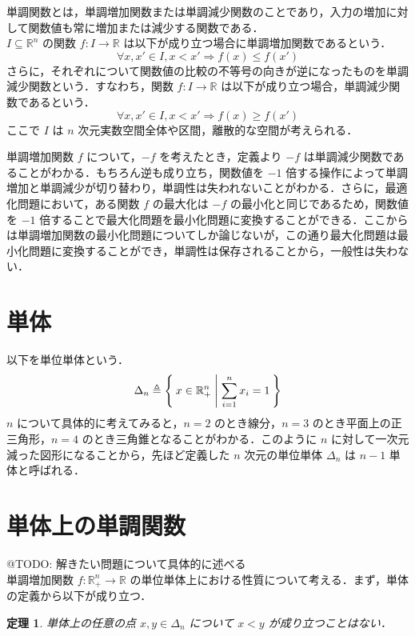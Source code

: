\documentclass[a4paper,11pt]{jreport}
\newtheorem{theorem}{定理}
\begin{document}
単調関数とは，単調増加関数または単調減少関数のことであり，入力の増加に対して関数値も常に増加または減少する関数である．\\
$ I \subseteq \mathbb{R}^n $ の関数 $ f : I \to \mathbb{R} $ は以下が成り立つ場合に単調増加関数であるという．
$$ \forall x, x' \in I, x < x' \Rightarrow f(x) \leq f(x') $$
さらに，それぞれについて関数値の比較の不等号の向きが逆になったものを単調減少関数という．すなわち，関数 $ f : I \to \mathbb{R} $ は以下が成り立つ場合，単調減少関数であるという．
$$ \forall x, x' \in I, x < x' \Rightarrow f(x) \geq f(x') $$
ここで $ I $ は $ n $ 次元実数空間全体や区間，離散的な空間が考えられる．\par
単調増加関数 $ f $ について，$ -f $ を考えたとき，定義より $ -f $ は単調減少関数であることがわかる．もちろん逆も成り立ち，関数値を $ -1 $ 倍する操作によって単調増加と単調減少が切り替わり，単調性は失われないことがわかる．さらに，最適化問題において，ある関数 $ f $ の最大化は $ -f $ の最小化と同じであるため，関数値を $ -1 $ 倍することで最大化問題を最小化問題に変換することができる．ここからは単調増加関数の最小化問題についてしか論じないが，この通り最大化問題は最小化問題に変換することができ，単調性は保存されることから，一般性は失わない．

\section{単体}

以下を単位単体という．
$$ \Delta_n \triangleq \Set{ x \in \mathbb{R}^n_{+} | \sum_{i=1}^{n} x_i = 1 } $$
$ n $ について具体的に考えてみると，$ n=2 $ のとき線分，$ n=3 $ のとき平面上の正三角形，$ n=4 $ のとき三角錐となることがわかる．このように $n$ に対して一次元減った図形になることから，先ほど定義した $n$ 次元の単位単体 $ \Delta_n $ は $ n-1 $ 単体と呼ばれる．

\section{単体上の単調関数}

@TODO: 解きたい問題について具体的に述べる \\
単調増加関数 $ f : \mathbb{R}^n_{+} \to \mathbb{R} $ の単位単体上における性質について考える．まず，単体の定義から以下が成り立つ．\\

\begin{theorem}
単体上の任意の点 $ x, y \in \Delta_n $ について $ x < y $ が成り立つことはない．
\end{theorem}
\end{document}
